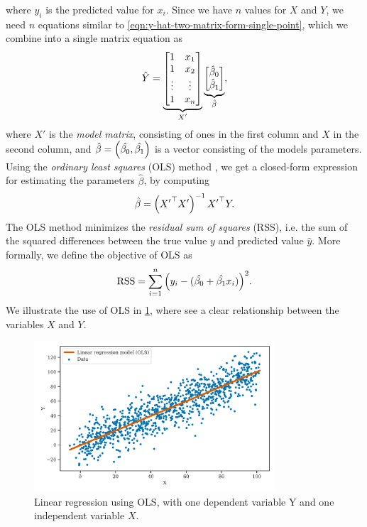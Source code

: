 where $\hat{y_i}$ is the predicted value for $x_i$. Since we have $n$ values for $X$ and $Y$, we need $n$ equations similar to \cref{eqn:y-hat-two-matrix-form-single-point}, which we combine into a single matrix equation as
\begin{align}
    \hat{Y} =
        \undertext{
        \begin{bmatrix}
            1 & x_1 \\
            1 & x_2 \\
            \vdots & \vdots \\
            1 & x_n \\
        \end{bmatrix}
        }{$X'$}
        \undertext{
        \begin{bmatrix}
            \hat{\beta}_0 \\
            \hat{\beta}_1 \\
        \end{bmatrix}
        }{$\hat{\beta}$},
    \label{eqn:y-hat-two-matrix-form}
\end{align}
where $X'$ is the \textit{model matrix}, consisting of ones in the first column and $X$ in the second column, and $\hat{\beta} = \left(\hat{\beta_0}, \hat{\beta_1}\right)$ is a vector consisting of the models parameters. Using the \textit{ordinary least squares} (OLS) method \cite[p. 208]{fox2015applied}, we get a closed-form expression for estimating the parameters $\hat{\beta}$, by computing
\begin{align}
    \hat{\beta} = \left({X'}^\top X'\right)^{-1} {X'}^\top Y.
    \label{eqn:ordinary-least-squares}
\end{align}
The OLS method minimizes the \textit{residual sum of squares} (RSS), i.e. the sum of the squared differences between the true value $y$ and predicted value $\hat{y}$. More formally, we define the objective of OLS as
\begin{align}
    \text{RSS} = \sum\limits_{i=1}^{n}{\left(y_i - (\hat{\beta_0} + \hat{\beta_1}x_i)\right)^2}.
    \label{eqn:RSS-ols-two-variables}
\end{align}
We illustrate the use of OLS in \cref{fig:linear-regression-ols}, where see a clear relationship between the variables $X$ and $Y$.
\begin{figure}[H]
    \centering
    \includegraphics[width=0.8\textwidth]{thesis/figures/linear-regression-example.pdf}
    \caption{Linear regression using OLS, with one dependent variable Y and one independent variable $X$.}
    \label{fig:linear-regression-ols}
\end{figure}

